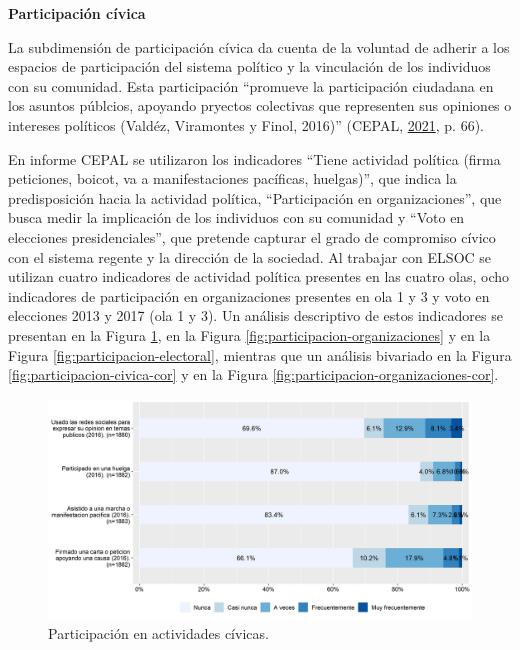\documentclass[
  12pt,
]{book}
\begin{document}
\textbf{Participación cívica}

La subdimensión de participación cívica da cuenta de la voluntad de adherir a los espacios de participación del sistema político y la vinculación de los individuos con su comunidad. Esta participación ``promueve la participación ciudadana en los asuntos públcios, apoyando pryectos colectivas que representen sus opiniones o intereses políticos (Valdéz, Viramontes y Finol, 2016)'' (CEPAL, \protect\hyperlink{ref-cepal_Cohesion_2021}{2021}, p. 66).

En informe CEPAL se utilizaron los indicadores ``Tiene actividad política (firma peticiones, boicot, va a manifestaciones pacíficas, huelgas)'', que indica la predisposición hacia la actividad política, ``Participación en organizaciones'', que busca medir la implicación de los individuos con su comunidad y ``Voto en elecciones presidenciales'', que pretende capturar el grado de compromiso cívico con el sistema regente y la dirección de la sociedad. Al trabajar con ELSOC se utilizan cuatro indicadores de actividad política presentes en las cuatro olas, ocho indicadores de participación en organizaciones presentes en ola 1 y 3 y voto en elecciones 2013 y 2017 (ola 1 y 3). Un análisis descriptivo de estos indicadores se presentan en la Figura \ref{fig:participacion-civica}, en la Figura \ref{fig:participacion-organizaciones} y en la Figura \ref{fig:participacion-electoral}, mientras que un análisis bivariado en la Figura \ref{fig:participacion-civica-cor} y en la Figura \ref{fig:participacion-organizaciones-cor}.

\begin{figure}[H]

{\centering \includegraphics[width=1\linewidth,height=1\textheight]{output/graphs/participacion-civica} 

}

\caption{Participación en actividades cívicas.}\label{fig:participacion-civica}
\end{figure}
\end{document}
